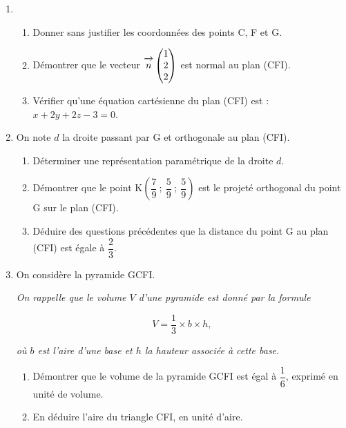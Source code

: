 \documentclass[10pt,a4paper]{article}
\newcommand{\vect}[1]{\overrightarrow{\,\mathstrut#1\,}}
\begin{document}
\smallskip

\begin{enumerate}
\item 
	\begin{enumerate}
		\item Donner sans justifier les coordonnées des points C, F et G.
		\item Démontrer que le vecteur $\vect{n}\begin{pmatrix}1\\2\\2\end{pmatrix}$ est normal au plan (CFI).
		\item Vérifier qu'une équation cartésienne du plan (CFI) est : $x + 2y + 2z - 3 = 0$.
	\end{enumerate}	
\item  On note $d$ la droite passant par G et orthogonale au plan (CFI).
	\begin{enumerate}
		\item Déterminer une représentation paramétrique de la droite $d$.
		\item Démontrer que le point K$\left(\dfrac79~;~\dfrac59~;~\dfrac59\right)$ est le projeté orthogonal du point G sur le plan (CFI).
		\item Déduire des questions précédentes que la distance du point G au plan (CFI) est
égale à $\dfrac23$.
	\end{enumerate}
\item On considère la pyramide GCFI.

\emph{On rappelle que le volume $V$ d'une pyramide est donné par la formule} 

\[V = \frac13 \times b \times h,\]

\emph{où $b$ est l'aire d'une base et $h$ la hauteur associée à cette base}.
	\begin{enumerate}
		\item Démontrer que le volume de la pyramide GCFI est égal à $\dfrac16$, exprimé en unité de volume.
		\item En déduire l'aire du triangle CFI, en unité d'aire.
	\end{enumerate}
\end{enumerate}

\newpage
\hypertarget{Metropole3}{}
\end{document}
